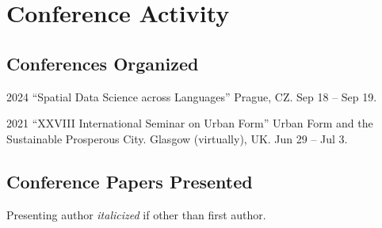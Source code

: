 \documentclass[12pt,a4paper]{report}
\begin{document}
    \section*{Conference Activity}


    \subsection*{Conferences Organized}

    \begin{tablist}

        \item[2024] \tab{}\enquote{Spatial Data Science across Languages} Prague, CZ. Sep 18 -- Sep 19.
        \item[2021] \tab{}\enquote{XXVIII International Seminar on Urban Form} Urban Form and the Sustainable Prosperous City. Glasgow (virtually), UK. Jun 29 -- Jul 3.

    \end{tablist}

    \subsection*{Conference Papers Presented}

    Presenting author \textit{italicized} if other than first author.\bigskip
\end{document}
